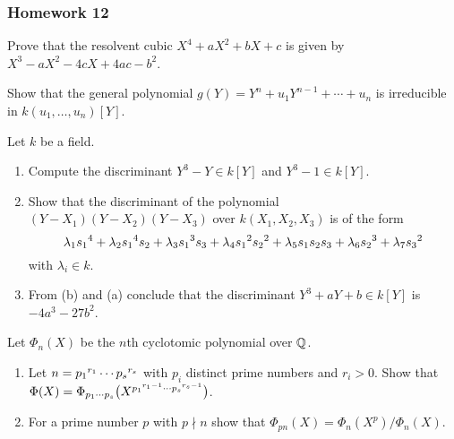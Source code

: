 \subsubsection{Homework 12}
\setcounter{exercise}{0}
\setcounter{equation}{0}

\begin{problem}
  Prove that the resolvent cubic \(X^4+aX^2+bX+c\) is given by
  \(X^3-aX^2-4cX+4ac-b^2\).
\end{problem}
\begin{solution}
\end{solution}

\begin{problem}
  Show that the general polynomial \(g(Y)=Y^n+u_1Y^{n-1}+\dotsb+u_n\) is
  irreducible in \(k(u_1,\dotsc,u_n)[Y]\).
\end{problem}
\begin{solution}
\end{solution}

\begin{problem}
  Let \(k\) be a field.
  \begin{enumerate}[label=(\alph*)]
  \item Compute the discriminant \(Y^3-Y\in k[Y]\) and \(Y^3-1\in k[Y]\).
  \item Show that the discriminant of the polynomial
    \((Y-X_1)(Y-X_2)(Y-X_3)\) over \(k(X_1,X_2,X_3)\) is of the form
    \[
      \lambda_1{s_1}^{\cramped{4}}+
      \lambda_2{s_1}^{\cramped{4}}s_2+
      \lambda_3{s_1}^{\cramped{3}}s_3+
      \lambda_4{s_1}^{\cramped{2}}{s_2}^{\cramped{2}}+
      \lambda_5s_1s_2s_3+\lambda_6{s_2}^{\cramped{3}}+
      \lambda_7{s_3}^{\cramped{2}}
    \]
    with \(\lambda_i\in k\).
  \item From (b) and (a) conclude that the discriminant
    \(Y^3+aY+b\in k[Y]\) is \(-4a^3-27b^2\).
\end{enumerate}
\end{problem}
\begin{solution}
\end{solution}

\begin{problem}
  Let \(\Phi_n(X)\) be the \(n\)th cyclotomic polynomial over \(\mathbb{Q}\).
  \begin{enumerate}[label=(\alph*)]
  \item Let \(n={p_1}^{\cramped{r_1}}\dotsm{p_s}^{\cramped{r_s}}\) with \(p_i\) distinct prime
    numbers and \(r_i>0\). Show that
    \(\Phi(X)=\Phi_{p_1\dotsm p_s}\bigl(X^{{p_1}^{\cramped{r_1-1}}
      \dotsm{p_s}^{\cramped{r_s-1}}}\bigr)\).
  \item For a prime number \(p\) with \(p\nmid n\) show that
    \(\Phi_{pn}(X)=\Phi_n(X^p)/\Phi_n(X)\).
  \end{enumerate}
\end{problem}
\begin{solution}
\end{solution}

